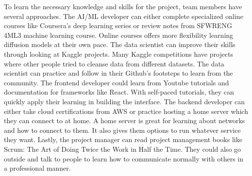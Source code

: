\documentclass[12pt]{article}
\begin{document}
\begin{enumerate}
  To learn the necessary knowledge and skills for the project, team members have several 
  approaches. The AI/ML developer can either complete specialized online courses like Coursera’s 
  deep learning series or review notes from SFWRENG 4ML3 machine learning course. Online courses 
  offers more flexibility learning diffusion models at their own pace. The data scientist can 
  improve their skills through looking at Kaggle projects. Many Kaggle competitions have projects 
  where other people tried to cleanse data from different datasets. The data scientist can 
  practice and follow in their Github’s footsteps to learn from the community. The frontend 
  developer could learn from Youtube tutorials and documentation for frameworks like React. With 
  self-paced tutorials, they can quickly apply their learning in building the interface. The 
  backend developer can either take cloud certifications from AWS or practice hosting a home 
  server which they can connect to at home. A home server is great for learning about networks and 
  how to connect to them. It also gives them options to run whatever service they want. Lastly, 
  the project manager can read project management books like Scrum: The Art of Doing Twice the 
  Work in Half the Time. They could also go outside and talk to people to learn how to communicate 
  normally with others in a professional manner.

\end{enumerate}
\end{document}
